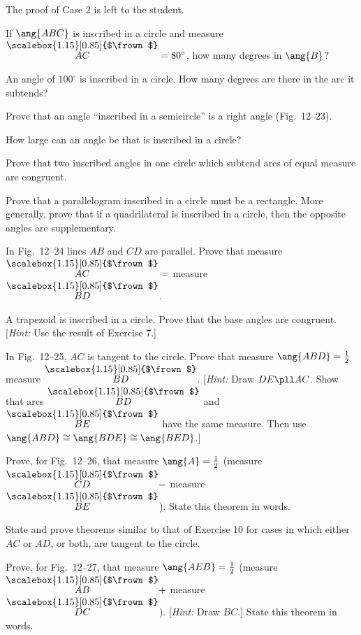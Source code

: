 \documentclass[11pt]{book}
\theoremstyle{bkplain}
\theoremstyle{XIplainnote}
\theoremstyle{bkplain}
\newcommand{\XIIarc}[1]{\overset{\raisebox{-0.25ex}{\scalebox{1.15}[0.85]{$\frown$}}}{#1}}
\theoremstyle{bkplain}
\begin{document}
The proof of Case 2 is left to the student.

\begin{exercisecols}
\begin{exlist}
\item If $\ang{ABC}$ is inscribed in a circle and measure
      $\XIIarc{AC} = 80^\circ$, how many degrees in $\ang{B}$?
\item An angle of $100^\circ$ is inscribed in a circle. How many degrees are
      there in the arc it subtends?
\item Prove that an angle ``inscribed in a semicircle'' is a right angle
      (Fig.~12--23).
\exfig{\FIGXIITWENTYTHREE}
\item How large can an angle be that is inscribed in a circle?
\item Prove that two inscribed angles in one circle which subtend arcs of equal
      measure are congruent.
\item Prove that a parallelogram inscribed in a circle must be a rectangle. More
      generally, prove that if a quadrilateral is inscribed in a circle, then the
      opposite angles are supplementary.
\item In Fig.~12--24 lines $AB$ and $CD$ are parallel. Prove that measure
      $\XIIarc{AC} = $ measure $\XIIarc{BD}$.
\exfig{\FIGXIITWENTYFOUR}
\item A trapezoid is inscribed in a circle. Prove that the base angles are
      congruent. [\emph{Hint:} Use the result of Exercise 7.]
\item[\stex 9.] In Fig.~12--25, $AC$ is tangent to the circle. Prove that
      measure $\ang{ABD} = \frac{1}{2}$ measure $\XIIarc{BD}$. [\emph{Hint:}
      Draw $DE \pll AC$. Show that arcs $\XIIarc{BD}$ and $\XIIarc{BE}$ have the
      same measure. Then use $\ang{ABD} \cong \ang{BDE} \cong \ang{BED}$.]
\exfig{\FIGXIITWENTYFIVE}
\item[\stex 10.] Prove, for Fig.~12--26, that measure
      $\ang{A} = \frac{1}{2}$ (measure $\XIIarc{CD} - $ measure $\XIIarc{BE}$).
      State this theorem in words.
\exfig{\FIGXIITWENTYSIX}
\item[\stex 11.] State and prove theorems similar to that of Exercise 10 for
      cases in which either $AC$ or $AD$, or both, are tangent to the circle.
\item[\stex 12.] Prove, for Fig.~12--27, that measure
      $\ang{AEB} = \frac{1}{2}$ (measure $\XIIarc{AB} + $ measure
      $\XIIarc{DC}$). [\emph{Hint:} Draw $BC$.] State this theorem in words.
\exfig{\FIGXIITWENTYSEVEN}

\end{exlist}
\end{exercisecols}
\end{document}
